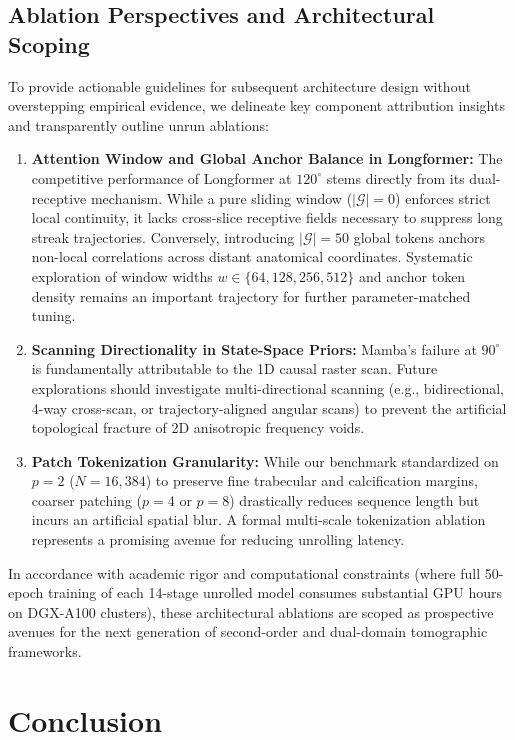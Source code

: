 \documentclass[runningheads]{llncs}
\begin{document}
\subsection{Ablation Perspectives and Architectural Scoping}
\label{sec:ablation_scoping}
To provide actionable guidelines for subsequent architecture design without overstepping empirical evidence, we delineate key component attribution insights and transparently outline unrun ablations:
\begin{enumerate}
    \item \textbf{Attention Window and Global Anchor Balance in Longformer:} The competitive performance of Longformer at $120^\circ$ stems directly from its dual-receptive mechanism. While a pure sliding window ($|\mathcal{G}| = 0$) enforces strict local continuity, it lacks cross-slice receptive fields necessary to suppress long streak trajectories. Conversely, introducing $|\mathcal{G}| = 50$ global tokens anchors non-local correlations across distant anatomical coordinates. Systematic exploration of window widths $w \in \{64, 128, 256, 512\}$ and anchor token density remains an important trajectory for further parameter-matched tuning.
    \item \textbf{Scanning Directionality in State-Space Priors:} Mamba's failure at $90^\circ$ is fundamentally attributable to the 1D causal raster scan. Future explorations should investigate multi-directional scanning (e.g., bidirectional, 4-way cross-scan, or trajectory-aligned angular scans) to prevent the artificial topological fracture of 2D anisotropic frequency voids.
    \item \textbf{Patch Tokenization Granularity:} While our benchmark standardized on $p=2$ ($N=16,384$) to preserve fine trabecular and calcification margins, coarser patching ($p=4$ or $p=8$) drastically reduces sequence length but incurs an artificial spatial blur. A formal multi-scale tokenization ablation represents a promising avenue for reducing unrolling latency.
\end{enumerate}
In accordance with academic rigor and computational constraints (where full 50-epoch training of each 14-stage unrolled model consumes substantial GPU hours on DGX-A100 clusters), these architectural ablations are scoped as prospective avenues for the next generation of second-order and dual-domain tomographic frameworks.

\section{Conclusion}
\label{sec:conclusion}
\end{document}
